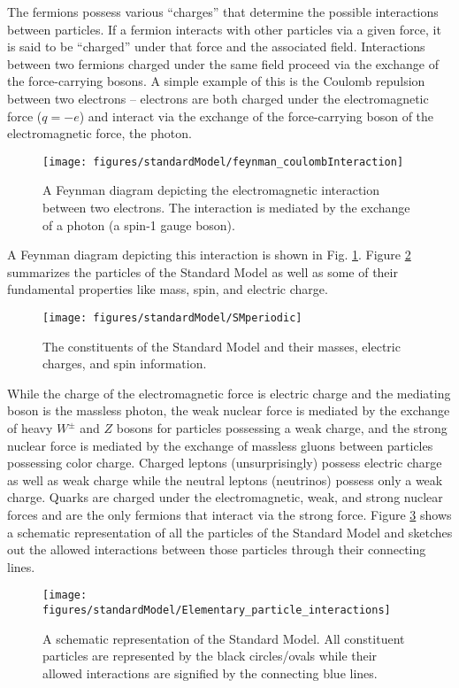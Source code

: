 The fermions possess various ``charges'' that determine the possible interactions between particles. If a fermion interacts with other particles via a given force, it is said to be ``charged'' under that force and the associated field. Interactions between two fermions charged under the same field proceed via the exchange of the force-carrying bosons. A simple example of this is the Coulomb repulsion between two electrons -- electrons are both charged under the electromagnetic force ($q=-e$) and interact via the exchange of the force-carrying boson of the electromagnetic force, the photon. 
\begin{figure}[!ht]
\centering
\texttt{[image: figures/standardModel/feynman\_coulombInteraction]}
\caption{A Feynman diagram depicting the electromagnetic interaction between two electrons. The interaction is mediated by the exchange of a photon (a spin-1 gauge boson).}
\label{feynman}
\end{figure}
A Feynman diagram depicting this interaction is shown in Fig. \ref{feynman}. Figure \ref{periodic} summarizes the particles of the Standard Model as well as some of their fundamental properties like mass, spin, and electric charge. 
\begin{figure}
\centering
\texttt{[image: figures/standardModel/SMperiodic]}
\caption{The constituents of the Standard Model and their masses, electric charges, and spin information.}
\label{periodic}
\end{figure}
While the charge of the electromagnetic force is electric charge and the mediating boson is the massless photon, the weak nuclear force is mediated by the exchange of heavy $W^{\pm}$ and $Z$ bosons for particles possessing a weak charge, and the strong nuclear force is mediated by the exchange of massless gluons between particles possessing color charge. Charged leptons (unsurprisingly) possess electric charge as well as weak charge while the neutral leptons (neutrinos) possess only a weak charge. Quarks are charged under the electromagnetic, weak, and strong nuclear forces and are the only fermions that interact via the strong force. Figure \ref{interactionsSM} shows a schematic representation of all the particles of the Standard Model and sketches out the allowed interactions between those particles through their connecting lines.
\begin{figure}[!h]
\centering
\texttt{[image: figures/standardModel/Elementary\_particle\_interactions]}
\caption{A schematic representation of the Standard Model. All constituent particles are represented by the black circles/ovals while their allowed interactions are signified by the connecting blue lines.}
\label{interactionsSM}
\end{figure}

